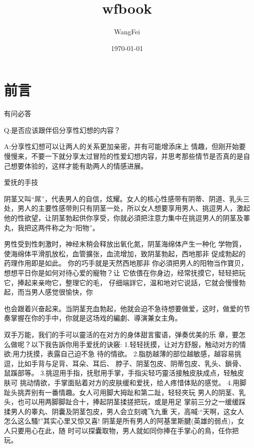 \documentclass[12pt,UTF8]{ctexbook}
\title{\heiti\zihao{0} wfbook}
\author{WangFei}
\date{\today}
\begin{document}
\maketitle
\tableofcontents

\frontmatter

\chapter{前言}

有问必答

Q:是否应该跟伴侣分享性幻想的内容？

A:分享性幻想可以让两人的关系更加亲密，并有可能增添床上
情趣，但刚开始要慢慢来，不要一下就分享太过冒险的性爱幻想内容，并思考那些情节是否真的是自己想要体验的，这样才能有助两人的情感进展。

爱抚的手技

阴茎又叫“屌”，代表男人的自信，炫耀。女人的核心性感带有阴蒂、阴道、乳头三处，男人的主要性感带則只有阴茎一处，所以女人想要享用男人、挑逗男人，激起他的性欲望，让阴茎勃起供你享受，你就必須把注意力集中在挑逗男人的阴茎及睪丸，我把这两件称之为“阳物”。

男性受到性刺激时，神经末稍会释放出氧化氮，阴茎海绵体产生一种化
学物質，使海绵体平滑肌放松，血管擴张，血流增加，致阴茎勃起，西地那非
促成勃起的药理作用即是如此。
你的巧手就是天然西地那非
你必須把男人的阳物当作寶贝，想想平日你是如何对待心爱的寵物？让
它依偎在你身边，经常抚摸它，轻轻把玩它，捧起来亲吻它，整理它的毛，
仔细端詳它，温和地对它说話，它就会慢慢勃起，而当男人感觉很愉快，你

也会跟着兴奋起来。当阴茎充血勃起，他就会迫不急待想要做爱，这时，做爱的节奏掌握在你的手中，你就是这场戏的編劇、導演兼女主角。

双手万能，我们的手可以靈活的在对方的身体甜言蜜语，弹奏优美的乐
章，要怎么做呢？以下我告訴你用手爱抚的诀竅:
1.轻轻抚摸，让对方舒服，触动对方的情欲;用力抚摸，表露自己迫不急
待的情欲。
2.脂肪越薄的部位越敏感，越容易挑逗，比如手背与足背、耳朵、耳后、
脖子、阴茎包皮、阴蒂包皮、乳头、鎖骨、鼠蹊部等。
3.挑逗用手指，抚慰用手掌，手指尖轻巧靈活接触皮肤成点，轻触皮肤可
挑动情欲，手掌面贴着对方的皮肤缓和爱抚，给人疼惜体贴的感觉。
4.用脚趾头挑弄别有一番情趣。女人可用脚大拇趾和第二趾，轻轻夾玩
男人的阴茎、乳头，也可以用两脚脚趾合十，捧起阴茎揉搓把玩，或是用足
掌前三分之一缓缓踩揉男人的睾丸、阴囊及阴茎包皮，男人会立刻魂飞九重
天，高喊:“天啊，这女人怎么这么騷!”其实心里又惊又喜!
阴茎是所有男人的阿基里斯腱(英雄的弱点)，女人只要用心在此，随
时可以探囊取物，男人就如同你捧在手掌心的鳥，任你把玩。
\end{document}
